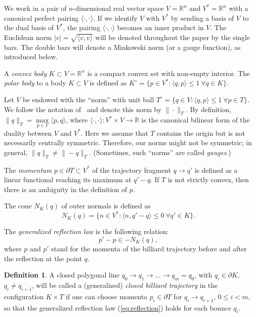 \documentclass[12pt,a4paper,oneside]{amsart}
\theoremstyle{definition}
\newtheorem{definition}[theorem]{Definition}
\theoremstyle{remark}
\numberwithin{equation}{section}
\begin{document}
We work in a pair of $n$-dimensional real vector space $V = \mathbb{R}^n$ and $V^* = \mathbb{R}^n$ with a canonical perfect pairing $\langle \cdot, \cdot \rangle$. If we identify $V$ with $V^*$ by sending a basis of $V$ to the dual basis of $V^*$, the pairing $\langle \cdot, \cdot \rangle$ becomes an inner product in $V$. The Euclidean norm $|v| = \sqrt{\langle v, v \rangle}$ will be denoted throughout the paper by the single bars. The double bars will denote a Minkowski norm (or a gauge function), as introduced below.

A \emph{convex body} $K \subset V = \mathbb{R}^n$ is a compact convex set with non-empty interior. The \emph{polar body} to a body $K \subset V$ is defined as $K^\circ = \{p \in V^*: \langle q, p \rangle \le 1 ~\forall q\in K\}$.

Let $V$ be endowed with the ``norm'' with unit ball $T^\circ = \{q \in V: \langle q, p \rangle \le 1 ~\forall p\in T\}$. We follow the notation of~\cite{akopyan2016elementary} and denote this norm by $\|\cdot\|_T$.
By definition, $\|q\|_T = \max\limits_{p \in T} \langle p, q \rangle$, where $\langle \cdot, \cdot \rangle : V^* \times V \rightarrow \mathbb{R}$ is the canonical bilinear form of the duality between $V$ and $V^*$. Here we assume that $T$ contains the origin but is not necessarily centrally symmetric. Therefore, our norms might not be symmetric; in general, $\|q\|_T \neq \|-q\|_T$. (Sometimes, such ``norms'' are called \emph{gauges}.)

The \emph{momentum} $p \in \partial T \subset V^*$ of the trajectory fragment $q \to q'$ is defined as a linear functional reaching its maximum at $q' - q$. If $T$ is not strictly convex, then there is an ambiguity in the definition of $p$.

The cone $N_K(q)$ of outer normals is defined as
$$
N_K(q) = \{n \in V^*: \langle n, q' - q\rangle \le 0 \ \forall q' \in K\}.
$$

The \emph{generalized reflection law} is the following relation:
\begin{equation}
\label{eq:reflection}
p' - p \in -N_K(q),
\end{equation}
where $p$ and $p'$ stand for the momenta of the billiard trajectory before and after the reflection at the point $q$.

\begin{definition}
\label{def:billiard}
A closed polygonal line $q_0 \to q_1 \to \ldots \to q_m = q_0$, with $q_i \in \partial K$, $q_i \neq q_{i+1}$, will be called a (generalized) \emph{closed billiard trajectory} in the configuration $K\times T$ if one can choose momenta $p_i \in \partial T$ for $q_{i} \to q_{i+1}$, $0 \le i < m$, so that the generalized reflection law (\ref{eq:reflection}) holds for each bounce $q_i$.
\end{definition}
\end{document}
